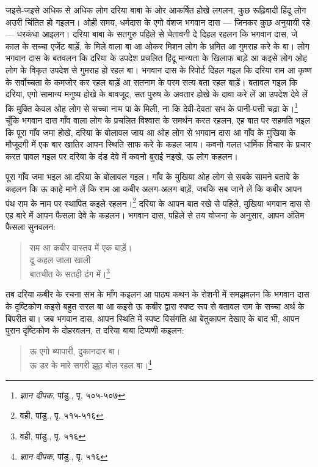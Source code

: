जइसे-जइसे अधिक से अधिक लोग दरिया बाबा के ओर आकर्षित होखे लगलन, कुछ रूढ़िवादी हिंदू लोग अउरी चिंतित हो गइलन। ओही समय, धर्मदास के एगो वंशज भगवान दास — जिनकर कुछ अनुयायी रहे — धरकंधा आइलन। दरिया बाबा के सतगुरु पहिले से चेतावनी दे दिहल रहलन कि भगवान दास, जे काल के सच्चा एजेंट बाड़ें, के मिले वाला बा आ ओकर मिशन लोग के भ्रमित आ गुमराह करे के बा। लोग भगवान दास के बतवलन कि दरिया के उपदेश प्रचलित हिंदू मान्यता के खिलाफ बाड़े आ कइसे लोग ओह लोग के विकृत उपदेश से गुमराह हो रहल बा। भगवान दास के रिपोर्ट दिहल गइल कि दरिया राम आ कृष्ण के सर्वोच्चता के कमजोर कर रहल बाड़ें आ सतनाम के परम सत्य बता रहल बाड़ें। बतावल गइल कि दरिया, एगो सामान्य मनुष्य होखे के बावजूद, सत पुरुष के अवतार होखे के दावा करे लें आ उपदेश देवे लें कि मुक्ति केवल ओह लोग से सच्चा नाम पा के मिली, ना कि देवी-देवता सभ के पानी-पत्ती चढ़ा के।\footnote{\textit{ज्ञान दीपक}, पांडु., पृ. ५०५-५०७} चूँकि भगवान दास गाँव वाला लोग के प्रचलित विश्वास के समर्थन करत रहलन, एह बात पर सहमति भइल कि पूरा गाँव जमा होखे, दरिया के बोलावल जाय आ ओह लोग से भगवान दास आ गाँव के मुखिया के मौजूदगी में एक बार खातिर आपन स्थिति साफ करे के कहल जाय। कवनो गलत धार्मिक विचार के प्रचार करत पावल गइल पर दरिया के दंड देवे में कवनो बुराई नइखे, ऊ लोग कहलन।

पूरा गाँव जमा भइल आ दरिया के बोलावल गइल। गाँव के मुखिया ओह लोग से सबके सामने बतावे के कहलन कि ऊ काहे माने लें कि राम आ कबीर अलग-अलग बाड़ें, जबकि सब जाने लें कि कबीर आपन पंथ राम के नाम पर स्थापित कइले रहलन।\footnote{वही, पांडु., पृ. ५१५-५१६} दरिया के आपन बात रखे से पहिले, मुखिया भगवान दास से एह बारे में आपन फैसला देवे के कहलन। भगवान दास, पहिले से तय योजना के अनुसार, आपन अंतिम फैसला सुनवलन:

\begin{quote}
राम आ कबीर वास्तव में एक बाड़ें। \\
दू कहल जाला खाली \\
बातचीत के सतही ढंग में।\footnote{वही, पांडु., पृ. ५१६}
\end{quote}

तब दरिया कबीर के रचना सभ के माँग कइलन आ पाठ्य कथन के रोशनी में समझवलन कि भगवान दास के दृष्टिकोण कइसे बहुत सरल बा आ कइसे ऊ कबीर द्वारा स्पष्ट रूप से बतावल राम के सच्चा अर्थ के बिपरीत बा। जब भगवान दास, आपन स्थिति में स्पष्ट विसंगति आ बेतुकापन देखाए के बाद भी, आपन पुरान दृष्टिकोण के दोहरवलन, त दरिया बाबा टिप्पणी कइलन:

\begin{quote}
ऊ एगो ब्यापारी, दुकानदार बा। \\
ऊ डर के मारे सगरी झूठ बोल रहल बा।\footnote{\textit{ज्ञान दीपक}, पांडु., पृ. ५१६}
\end{quote}


